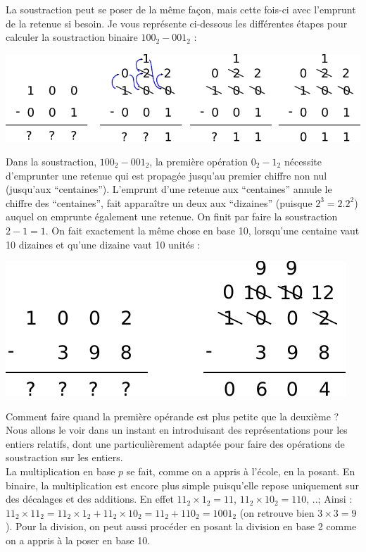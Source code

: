 La soustraction peut se poser de la même façon, mais cette fois-ci avec l'emprunt de la retenue si besoin. Je vous représente ci-dessous les différentes étapes pour calculer la soustraction binaire $100_2 - 001_2$ :
\begin{center}
\includegraphics[width=0.5\linewidth]{Figs/entiers_soustraction.pdf}
\end{center}
Dans la soustraction, $100_2 - 001_2$, la première opération $0_2 - 1_2$ nécessite d'emprunter une retenue qui est propagée jusqu'au premier chiffre non nul (jusqu'aux ``centaines''). L'emprunt d'une retenue aux ``centaines'' annule le chiffre des ``centaines'', fait apparaître un deux aux ``dizaines'' (puisque $2^3 = 2.2^2$) auquel on emprunte également une retenue. On finit par faire la soustraction $2 - 1 = 1$. On fait exactement la même chose en base 10, lorsqu'une centaine vaut 10 dizaines et qu'une dizaine vaut 10 unités :
\begin{center}
\includegraphics[width=0.5\linewidth]{Figs/entiers_soustraction_base10.pdf}
\end{center}
Comment faire quand la première opérande est plus petite que la deuxième ? Nous allons le voir dans un instant en introduisant des représentations pour les entiers relatifs, dont une particulièrement adaptée pour faire des opérations de soustraction sur les entiers.\\

La multiplication en base $p$ se fait, comme on a appris à l'école, en la posant. En binaire, la multiplication est encore plus simple puisqu'elle repose uniquement sur des décalages et des additions. En effet $11_2 \times 1_2 = 11$, $11_2 \times 10_2 = 110$, ..; Ainsi : $11_2 \times 11_2 = 11_2 \times 1_2 + 11_2 \times 10_2 = 11_2 + 110_2 = 1001_2$ (on retrouve bien $3 \times 3 = 9$). Pour la division, on peut aussi procéder en posant la division en base 2 comme on a appris à la poser en base 10.




